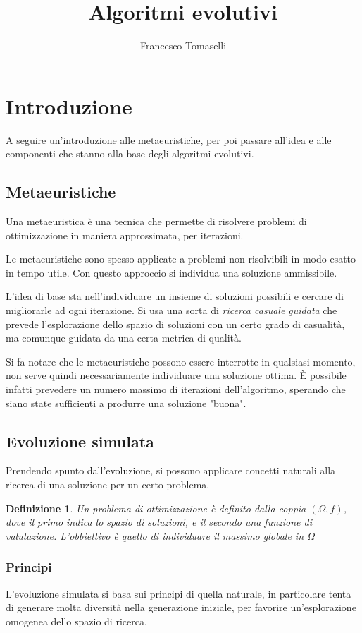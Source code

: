\documentclass[a4paper]{article}
\title{Algoritmi evolutivi}
\author{Francesco Tomaselli}
\newtheorem{definition}{Definizione}
\begin{document}
\maketitle
\tableofcontents
\setlength{\parindent}{0pt}
\setlength{\parskip}{0.8em}
\newpage
\section{Introduzione}
A seguire un'introduzione alle metaeuristiche, per poi passare all'idea 
e alle componenti che stanno alla base degli algoritmi evolutivi.
\subsection{Metaeuristiche}
Una metaeuristica è una tecnica che permette di risolvere problemi 
di ottimizzazione in maniera approssimata, per iterazioni.

Le metaeuristiche sono spesso applicate a problemi non risolvibili 
in modo esatto in tempo utile. Con questo approccio si individua una soluzione
ammissibile.

L'idea di base sta nell'individuare un insieme di soluzioni possibili e 
cercare di migliorarle ad ogni iterazione. Si usa una sorta di \emph{ricerca casuale guidata}
che prevede l'esplorazione dello spazio di soluzioni con un certo grado di casualità, 
ma comunque guidata da una certa metrica di qualità.

Si fa notare che le metaeuristiche possono essere interrotte in qualsiasi 
momento, non serve quindi necessariamente individuare una soluzione ottima.
È possibile infatti prevedere un numero massimo di iterazioni dell'algoritmo, 
sperando che siano state sufficienti a produrre una soluzione "buona".

\subsection{Evoluzione simulata}
Prendendo spunto dall'evoluzione, si possono applicare concetti naturali alla
ricerca di una soluzione per un certo problema.
\begin{definition}
    Un problema di ottimizzazione è definito dalla coppia $(\Omega, f)$, dove 
    il primo indica lo spazio di soluzioni, e il secondo una funzione di valutazione.
    L'obbiettivo è quello di individuare il massimo globale in $\Omega$
\end{definition}
\subsubsection{Principi}
L'evoluzione simulata si basa sui principi di quella naturale, 
in particolare tenta di generare molta diversità nella generazione iniziale, 
per favorire un'esplorazione omogenea dello spazio di ricerca.
\end{document}
